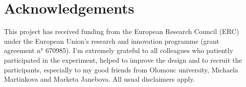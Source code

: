 \documentclass[output=paper]{langsci/langscibook}
\begin{document}
\section*{Acknowledgements}

This project has received funding from the European Research Council (ERC) under the European Union's \citealt{Horizon2020} research and innovation programme (grant agreement n° 670985). I’m extremely grateful to all colleagues who patiently participated in the experiment, helped to improve the design and to recruit the participants, especially to my good friends from Olomouc university, Michaela Martinkova and Marketa Janebova. All usual disclaimers apply.

\sloppy
\printbibliography[heading=subbibliography,notkeyword=this] 
\end{document}
